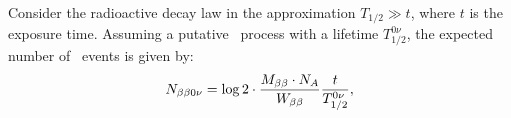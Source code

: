 
 Consider the radioactive decay law in the approximation $T_{1/2}\gg t$, where $t$ is the exposure time. Assuming a putative \bbonu\ process with a lifetime $T_{1/2}^{0\nu}$, the expected number of \bbonu\ events is given by:
%
\begin{equation}
N_{\beta\beta0\nu} = \log2 \cdot \frac{M_{\beta\beta}\cdot N_{A}}{W_{\beta\beta}}  \frac{t}{T_{1/2}^{0\nu}}, 
\label{eq:Nbb}
\end{equation}
%
